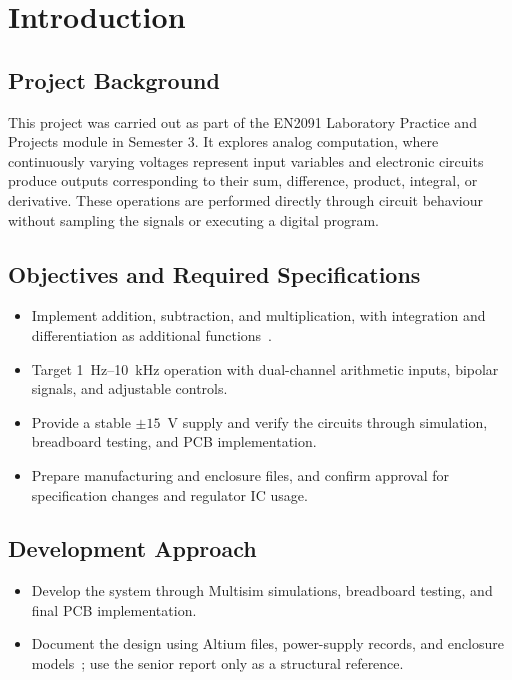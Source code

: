 \documentclass[11pt,a4paper]{article}
\begin{document}
\section{Introduction}
\subsection{Project Background}
This project was carried out as part of the EN2091 Laboratory Practice and Projects module in Semester 3. It explores analog computation, where continuously varying voltages represent input variables and electronic circuits produce outputs corresponding to their sum, difference, product, integral, or derivative. These operations are performed directly through circuit behaviour without sampling the signals or executing a digital program.

\subsection{Objectives and Required Specifications}
\begin{itemize}
    \item Implement addition, subtraction, and multiplication, with integration and differentiation as additional functions~\cite{brief}.
    \item Target 1~Hz--10~kHz operation with dual-channel arithmetic inputs, bipolar signals, and adjustable controls.
    \item Provide a stable $\pm15$~V supply and verify the circuits through simulation, breadboard testing, and PCB implementation.
    \item Prepare manufacturing and enclosure files, and confirm approval for specification changes and regulator IC usage.
\end{itemize}

\subsection{Development Approach}
\begin{itemize}
    \item Develop the system through Multisim simulations, breadboard testing, and final PCB implementation.
    \item Document the design using Altium files, power-supply records, and enclosure models~\cite{repository,designfiles}; use the senior report only as a structural reference.
\end{itemize}
\end{document}

